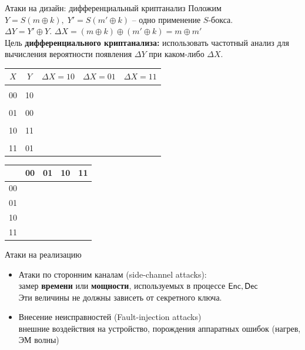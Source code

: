 \documentclass[usenames,dvipsnames,8pt,aspectratio=169]{beamer}
\begin{document}
\begin{frame}{Атаки на дизайн: дифференциальный криптанализ }
\Large 
Положим $Y = S(m \oplus k), \; Y' = S(m' \oplus k)$ -- одно применение $S$-бокса. \\[10pt]
$\Delta Y = Y' \oplus Y$. $\Delta X = (m \oplus k) \oplus (m' \oplus k) = m \oplus m'$ \\[10pt]

Цель {\color{Orange}\textbf{дифференциального криптанализа:}} использовать частотный анализ для вычисления вероятности появления $\Delta Y$ при каком-либо $\Delta X$. \\[10pt]

	\begin{tabular}{c | c | c | c | c  }
		$X$ & $Y$ & $ \Delta X = 10   $ & $ \Delta X = 01   $ & $ \Delta X = 11   $  \\ \hline
		& & & &\\ [-2pt]
		00 & 10 &  & &  \\  [5pt] \hline
		& & & &\\ [-2pt]
		01 & 00 &  & & \\[5pt] \hline
			& & & &\\ [-2pt]
		10 & 11 &  & & \\ [5pt] \hline
			& & & &\\ [-2pt]
		11 & 01 &  & & 
	\end{tabular}%
\hspace{5pt}
	\begin{tabular}{c | c | c | c | c  }
		& 00 & 01& 10 & 11 \\  [5pt]  \hline
	00 & & & &  \\   \hline
	01 & & & &  \\   \hline
	10 & & & &  \\  \hline
	11 & & & &  \\   \hline
\end{tabular}%
\end{frame}


\begin{frame}{Атаки на реализацию}
\LARGE
\begin{itemize}
	\itemsep 1em
	\item Атаки по сторонним каналам (side-channel attacks): \\[2pt]
	замер {\color{Orange}\textbf{времени}} или {\color{Orange}\textbf{мощности}}, используемых в процессе $\textsf{Enc}, \textsf{Dec}$   \\[5pt]
	Эти величины не должны зависеть от секретного ключа.

	\item Внесение неисправностей (Fault-injection attacks)  \\[5pt]
	 внешние воздействия на устройство, порождения аппаратных ошибок (нагрев, ЭМ волны)
\end{itemize}
\end{frame}
\end{document}

